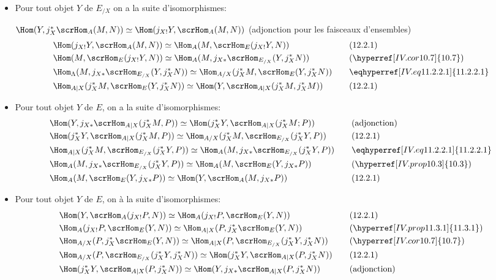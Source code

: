 \documentclass[10pt]{../fichiers-configuration-latex/smfart}
\begin{document}
\begin{itemize}
\item[Démontrons d).] Pour tout objet $Y$ de $E_{/X}$ on a la suite
d'isomorphismes:

$\Hom(Y,j^{\ast}_X\scrHom_A(M,N))\simeq \Hom(j_{X!}Y,\scrHom_A
(M,N))$ (adjonction pour les faisceaux d'ensembles)
\begin{alignat*}{2}
& \Hom(j_{X!}Y,\scrHom_A(M,N))\simeq \Hom_A (M,\scrHom_E(j_{X!}Y,
N))
&\quad& (12.2.1)\\
& \Hom(M, \scrHom_E(j_{X!}Y,N))\simeq \Hom_A
(M,j_{X\ast}\scrHom_{E_{/X}}(Y,j^{\ast}_XN)) && (\hyperref[IV.cor10.7]{10.7})\\
& \Hom_{\Lambda}(M, j_{X\ast}\scrHom_{E_{/X}}(Y, j^{\ast}_XN))\simeq
\Hom_{A/X}(j^{\ast}_XM, \scrHom_E (Y,j^{\ast}_XN)) && \eqhyperref[IV.eq11.2.2.1]{11.2.2.1}\\
 & \Hom_{A| X}(j^{\ast}_XM, \scrHom_E (Y, j^{\ast}_XN))\simeq
\Hom(Y,\scrHom_{A| X}(j^{\ast}_X M, j^{\ast}_XM)) && (12.2.1)
\end{alignat*}\pageoriginale

\item[Démontrons c).] Pour tout objet $Y$ de $E$, on a la suite
d'isomorphismes:
\begin{alignat*}{2}
& \Hom(Y,j_{X\ast}\scrHom_{A| X}(j^{\ast}_XM,P))\simeq
\Hom(j^{\ast}_XY, \scrHom_{A| X}(j^{\ast}_XM; P)) &\quad&
\text{(adjonction)}\\
&\Hom (j^{\ast}_XY, \scrHom_{A| X}(j^{\ast}_XM, P))\simeq
\Hom_{A/X}(j^{\ast}_XM, \scrHom_{E_{/X}}(j^{\ast}_XY,P)) && (12.2.1)\\
&\Hom_{A| X}(j^{\ast}_XM, \scrHom_{E_{/X}}(j^{\ast}_XY,P))\simeq
\Hom_A(M, j_{X\ast}\scrHom_{E_{/X}}(j^{\ast}_XY,P)) && \eqhyperref[IV.eq11.2.2.1]{11.2.2.1}\\
&\Hom_A(M,j_{X\ast}\scrHom_{E_{/X}}(j^{\ast}_XY,P))\simeq
\Hom_A(M,\scrHom_E(Y, j_{X\ast}P)) && (\hyperref[IV.prop10.3]{10.3})\\
&\Hom_A(M,\scrHom_E(Y, j_{X\ast}P))\simeq \Hom(Y,
\scrHom_A(M,j_{X\ast}P)) && (12.2.1)
\end{alignat*}

\item[Démontrons d).] Pour tout objet $Y$ de $E$, on à la suite
d'isomorphismes:
\begin{alignat*}{2}
& \Hom(Y,\scrHom_A(j_{X!}P,N))\simeq \Hom_A(j_{X!}P,\scrHom_E(Y,N))
&\quad& (12.2.1)\\
&\Hom_A(j_{X!}P,\scrHom_E(Y,N))\simeq \Hom_{A|
X}(P,j^{\ast}_X\scrHom_E(Y,N)) && (\hyperref[IV.prop11.3.1]{11.3.1})\\
&\Hom_{A/X}(P,j^{\ast}_X\scrHom_E(Y,N))\simeq \Hom_{A|
X}(P,\scrHom_{E_{/X}}(j^{\ast}_XY, j^{\ast}_XN)) && (\hyperref[IV.cor10.7]{10.7})\\
&\Hom_{A/X}(P,\scrHom_{E_{/X}}(j^{\ast}_XY, j^{\ast}_XN))\simeq
\Hom(j^{\ast}_XY, \scrHom_{A| X}(P,j^{\ast}_XN)) && (12.2.1)\\
&\Hom(j^{\ast}_XY, \scrHom_{A| X}(P,j^{\ast}_XN))\simeq \Hom(Y,
j_{X\ast}\scrHom_{A| X}(P, j^{\ast}_XN)) && \text{(adjonction)}
\end{alignat*}
\end{itemize}
\end{document}
